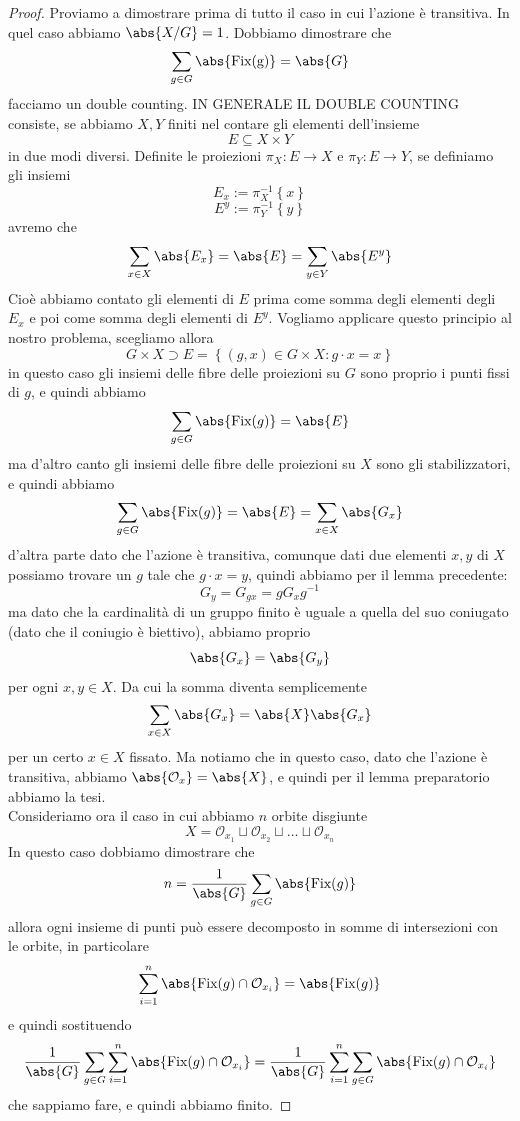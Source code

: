 \documentclass[11pt]{scrartcl}
\begin{document}
	\begin{proof}
		Proviamo a dimostrare prima di tutto il caso in cui l'azione è transitiva. In quel caso abbiamo $\abs{X/G}=1$. Dobbiamo dimostrare che
		$$\sum_{g\in G}\abs{\text{Fix(g)}}=\abs{G}$$
		facciamo un double counting. IN GENERALE IL DOUBLE COUNTING consiste, se abbiamo $X,Y$ finiti nel contare gli elementi dell'insieme
		$$E\subseteq X\times Y$$
		in due modi diversi. Definite le proiezioni $\pi_X:E\to X$ e $\pi_Y:E\to Y$, se definiamo gli insiemi
		$$E_x:=\pi_X^{-1}\left\{x\right\}$$
		$$E^y:=\pi_Y^{-1}\left\{y\right\}$$
		avremo che
		$$\sum_{x\in X}\abs{E_x}=\abs{E}=\sum_{y\in Y}\abs{E^y}$$
		Cioè abbiamo contato gli elementi di $E$ prima come somma degli elementi degli $E_x$ e poi come somma degli elementi di $E^y$.
		Vogliamo applicare questo principio al nostro problema, scegliamo allora 
		$$G\times X\supset E=\left\{(g,x)\in G\times X:g\cdot x=x\right\}$$
		in questo caso gli insiemi delle fibre delle proiezioni su $G$ sono proprio i punti fissi di $g$, e quindi abbiamo
		$$\sum_{g\in G}\abs{\text{Fix}(g)}=\abs{E}$$
		ma d'altro canto gli insiemi delle fibre delle proiezioni su $X$ sono gli stabilizzatori, e quindi abbiamo
		$$\sum_{g\in G}\abs{\text{Fix}(g)}=\abs{E}=\sum_{x\in X}\abs{G_x}$$
		d'altra parte dato che l'azione è transitiva, comunque dati due elementi $x,y$ di $X$ possiamo trovare un $g$ tale che $g\cdot x=y$, quindi abbiamo per il lemma precedente:
		$$G_y=G_{gx}=gG_{x}g^{-1}$$
		ma dato che la cardinalità di un gruppo finito è uguale a quella del suo coniugato (dato che il coniugio è biettivo), abbiamo proprio 
		$$\abs{G_x}=\abs{G_y}$$
		per ogni $x,y\in X$. Da cui la somma diventa semplicemente
		$$\sum_{x\in X}\abs{G_x}=\abs{X}\abs{G_x}$$
		per un certo $x\in X$ fissato. Ma notiamo che in questo caso, dato che l'azione è transitiva, abbiamo $\abs{\mathcal{O}_x}=\abs{X}$, e quindi per il lemma preparatorio abbiamo la tesi. \\
		Consideriamo ora il caso in cui abbiamo $n$ orbite disgiunte
		$$X= \mathcal{O}_{x_1}\sqcup \mathcal{O}_{x_2}\sqcup \dots \sqcup \mathcal{O}_{x_n}$$
		In questo caso dobbiamo dimostrare che 
		$$n=\frac{1}{\abs{G}}\sum_{g\in G}\abs{\text{Fix}(g)}$$ 
		allora ogni insieme di punti può essere decomposto in somme di intersezioni con le orbite, in particolare
		$$\sum_{i=1}^{n}\abs{\text{Fix}(g)\cap \mathcal{O}_{x_i}}=\abs{\text{Fix}(g)}$$
		e quindi sostituendo 
		$$\frac{1}{\abs{G}}\sum_{g\in G}\sum_{i=1}^{n}\abs{\text{Fix}(g)\cap \mathcal{O}_{x_i}}=\frac{1}{\abs{G}}\sum_{i=1}^n\sum_{g\in G}\abs{\text{Fix}(g)\cap \mathcal{O}_{x_i}}$$
		che sappiamo fare, e quindi abbiamo finito.
	\end{proof}
	
\end{document}
